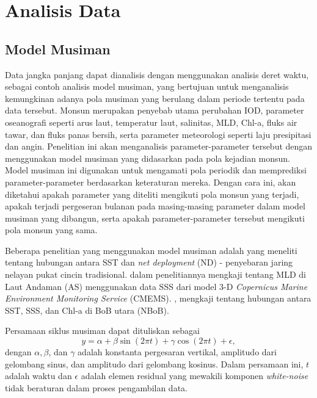 \section[Analisis Data]{Analisis Data}
\begin{spacing}{1.5}
	\subsection[Model Musiman]{Model Musiman}

	Data jangka panjang dapat dianalisis dengan menggunakan analisis deret waktu, sebagai contoh analisis model musiman, yang bertujuan untuk menganalisis kemungkinan adanya pola musiman yang berulang dalam periode tertentu pada data tersebut. Monsun merupakan penyebab utama perubahan IOD, parameter oseanografi seperti arus laut, temperatur laut, salinitas, MLD, Chl-a, fluks air tawar, dan fluks panas bersih, serta parameter meteorologi seperti laju presipitasi dan angin. Penelitian ini akan menganalisis parameter-parameter tersebut dengan menggunakan model musiman yang didasarkan pada pola kejadian monsun. Model musiman ini digunakan untuk mengamati pola periodik dan memprediksi parameter-parameter berdasarkan keteraturan mereka. Dengan cara ini, akan diketahui apakah parameter yang diteliti mengikuti pola monsun yang terjadi, apakah terjadi pergeseran bulanan pada masing-masing parameter dalam model musiman yang dibangun, serta apakah parameter-parameter tersebut mengikuti pola monsun yang sama.

	Beberapa penelitian yang menggunakan model musiman adalah  \citeyear{Haridhi2016} yang meneliti tentang hubungan antara SST dan \textit{net deployment} (ND) - penyebaran jaring nelayan pukat cincin tradisional.  \citeyear{Ikhwan2022} dalam penelitiannya mengkaji tentang MLD di Laut Andaman (AS) menggunakan data SSS dari model 3-D \textit{Copernicus Marine Environment Monitoring Service} (CMEMS).  \citeyear{hidayat2023relationship}, mengkaji tentang hubungan antara SST, SSS, dan Chl-a di BoB utara (NBoB). 
	
	Persamaan siklus musiman \cite{crawley2012r} dapat dituliskan sebagai
	\begin{equation}\label{eq:sm_}
		y = \alpha + \beta \sin(2\pi t)+\gamma \cos(2\pi t) + \epsilon,
	\end{equation}
	dengan $\alpha, \beta$, dan $\gamma$  adalah konstanta pergesaran vertikal, amplitudo dari gelombang sinus, dan amplitudo dari gelombang kosinus. Dalam persamaan ini, $t$ adalah waktu dan $\epsilon$ adalah elemen residual yang mewakili komponen \textit{white-noise} tidak beraturan dalam proses pengambilan data. 
	

\end{spacing}
